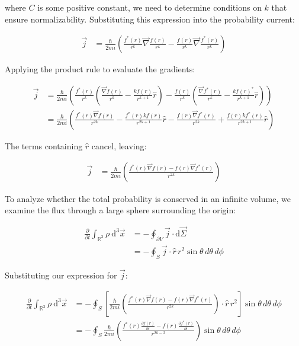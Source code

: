\documentclass[10pt]{article}
\begin{document}
where $C$ is some positive constant, we need to determine conditions on $k$ that ensure normalizability. Substituting this expression into the probability current:

\begin{align*}
\vec{j} &= \frac{\hbar}{2 m i}\left(\frac{f^{*}(r)}{r^{k}} \vec{\nabla} \frac{f(r)}{r^{k}}-\frac{f(r)}{r^{k}} \vec{\nabla} \frac{f^{*}(r)}{r^{k}}\right)
\end{align*}

Applying the product rule to evaluate the gradients:

\begin{align*}
\vec{j} &= \frac{\hbar}{2 m i}\left(\frac{f^{*}(r)}{r^{k}}\left(\frac{\vec{\nabla} f(r)}{r^{k}}-\frac{k f(r)}{r^{k+1}}\hat{r}\right)-\frac{f(r)}{r^{k}}\left(\frac{\vec{\nabla} f^{*}(r)}{r^{k}}-\frac{k f(r)^{*}}{r^{k+1}}\hat{r}\right)\right) \\
&= \frac{\hbar}{2 m i}\left(\frac{f^{*}(r) \vec{\nabla} f(r)}{r^{2 k}}-\frac{f^{*}(r) k f(r)}{r^{2 k+1}}\hat{r}-\frac{f(r) \vec{\nabla} f^{*}(r)}{r^{2 k}}+\frac{f(r) k f^{*}(r)}{r^{2 k+1}}\hat{r}\right) \tag{1.41}
\end{align*}

The terms containing $\hat{r}$ cancel, leaving:

\begin{align*}
\vec{j} &= \frac{\hbar}{2 m i}\left(\frac{f^{*}(r) \vec{\nabla} f(r)-f(r) \vec{\nabla} f^{*}(r)}{r^{2 k}}\right)
\end{align*}

To analyze whether the total probability is conserved in an infinite volume, we examine the flux through a large sphere surrounding the origin:

\begin{align*}
\frac{\partial}{\partial t} \int_{\mathbb{R}^{3}} \rho \mathrm{~d}^{3} \vec{x} &= -\oint_{\partial V} \vec{j} \cdot \mathrm{d} \vec{\Sigma} \\
&= -\oint_{S} \vec{j} \cdot \hat{r} \, r^{2} \sin\theta \, d\theta \, d\phi
\end{align*}

Substituting our expression for $\vec{j}$:

\begin{align*}
\frac{\partial}{\partial t} \int_{\mathbb{R}^{3}} \rho \mathrm{~d}^{3} \vec{x} &= -\oint_{S}\left[\frac{\hbar}{2 m i}\left(\frac{f^{*}(r) \vec{\nabla} f(r)-f(r) \vec{\nabla} f^{*}(r)}{r^{2 k}}\right) \cdot \hat{r} \, r^{2}\right] \sin\theta \, d\theta \, d\phi \tag{1.42} \\
&= -\oint_{S} \frac{\hbar}{2 m i}\left(\frac{f^{*}(r) \frac{\partial f(r)}{\partial r}-f(r) \frac{\partial f^{*}(r)}{\partial r}}{r^{2 k-2}}\right) \sin\theta \, d\theta \, d\phi
\end{align*}
\end{document}
